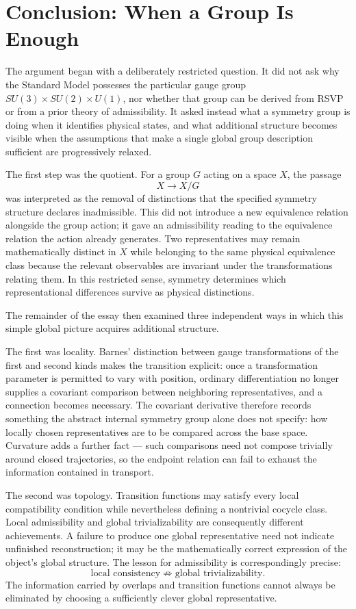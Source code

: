 \documentclass[11pt]{article}
\begin{document}
\section{Conclusion: When a Group Is Enough}

The argument began with a deliberately restricted question. It did not ask why the Standard Model possesses the particular gauge group $SU(3) \times SU(2) \times U(1)$, nor whether that group can be derived from RSVP or from a prior theory of admissibility. It asked instead what a symmetry group is doing when it identifies physical states, and what additional structure becomes visible when the assumptions that make a single global group description sufficient are progressively relaxed.

The first step was the quotient. For a group $G$ acting on a space $X$, the passage
\[
X \longrightarrow X/G
\]
was interpreted as the removal of distinctions that the specified symmetry structure declares inadmissible. This did not introduce a new equivalence relation alongside the group action; it gave an admissibility reading to the equivalence relation the action already generates. Two representatives may remain mathematically distinct in $X$ while belonging to the same physical equivalence class because the relevant observables are invariant under the transformations relating them. In this restricted sense, symmetry determines which representational differences survive as physical distinctions.

The remainder of the essay then examined three independent ways in which this simple global picture acquires additional structure.

The first was locality. Barnes' distinction between gauge transformations of the first and second kinds makes the transition explicit: once a transformation parameter is permitted to vary with position, ordinary differentiation no longer supplies a covariant comparison between neighboring representatives, and a connection becomes necessary. The covariant derivative therefore records something the abstract internal symmetry group alone does not specify: how locally chosen representatives are to be compared across the base space. Curvature adds a further fact — such comparisons need not compose trivially around closed trajectories, so the endpoint relation can fail to exhaust the information contained in transport.

The second was topology. Transition functions may satisfy every local compatibility condition while nevertheless defining a nontrivial cocycle class. Local admissibility and global trivializability are consequently different achievements. A failure to produce one global representative need not indicate unfinished reconstruction; it may be the mathematically correct expression of the object's global structure. The lesson for admissibility is correspondingly precise:
\[
\text{local consistency} \not\Rightarrow \text{global trivializability}.
\]
The information carried by overlaps and transition functions cannot always be eliminated by choosing a sufficiently clever global representative.
\end{document}

